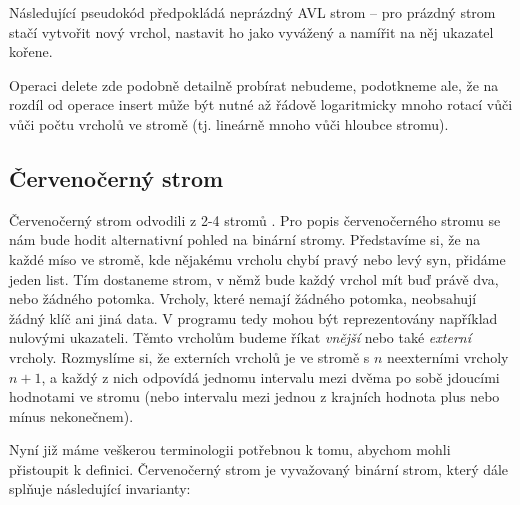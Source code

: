 Následující pseudokód předpokládá neprázdný
AVL strom -- pro prázdný strom stačí vytvořit nový vrchol, nastavit ho jako vyvážený a namířit na něj ukazatel kořene.



Operaci delete zde podobně detailně probírat nebudeme, podotkneme ale, že na rozdíl od operace insert může být nutné až řádově logaritmicky mnoho rotací vůči vůči počtu vrcholů ve stromě (tj. lineárně mnoho vůči hloubce stromu).



\subsection{Červenočerný strom}

Červenočerný strom odvodili z 2-4 stromů \citet{redblack}. Pro popis
červenočerného stromu se nám bude hodit alternativní pohled na binární stromy.
Představíme si, že na každé míso ve stromě, kde nějakému vrcholu chybí pravý nebo levý syn, přidáme jeden list.
Tím dostaneme strom, v němž bude každý vrchol mít buď právě dva, nebo
žádného potomka. Vrcholy, které nemají žádného potomka, neobsahují žádný klíč
ani jiná data. V programu tedy mohou být reprezentovány například nulovými
ukazateli. Těmto vrcholům budeme říkat \emph{vnější} nebo také \emph{externí}
vrcholy. Rozmyslíme si, že externích vrcholů je ve stromě s $n$ neexterními vrcholy $n+1$, a každý z nich odpovídá jednomu intervalu mezi dvěma po sobě jdoucími hodnotami ve stromu (nebo intervalu mezi jednou z krajních hodnota  plus nebo mínus nekonečnem).

Nyní již máme veškerou terminologii potřebnou k tomu, abychom mohli přistoupit k definici. Červenočerný strom je vyvažovaný binární strom, který dále splňuje následující invarianty:

